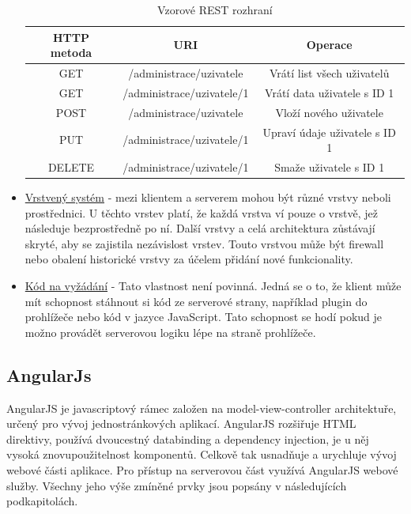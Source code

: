 \documentclass[czech,master,public,dept460,male,cpdeclaration,twoside]{diploma}
\begin{document}
\begin{itemize}
\begin{table}[H]
	\centering
	\caption{Vzorové REST rozhraní}
	\label{tab:REST}
	\begin{tabular}{|c|c|c|}
		\hline
		{\bf HTTP metoda} & {\bf URI} & {\bf Operace} \\
		\hline
		GET & /administrace/uzivatele & Vrátí list všech uživatelů \\
		\hline
		GET & /administrace/uzivatele/1 & Vrátí data uživatele s ID 1 \\
		\hline
		POST & /administrace/uzivatele & Vloží nového uživatele \\
		\hline
		PUT & /administrace/uzivatele/1 & Upraví údaje uživatele s ID 1 \\
		\hline
		DELETE & /administrace/uzivatele/1 & Smaže uživatele s ID 1 \\
		\hline
	\end{tabular}
\end{table}
	\item \underline{Vrstvený systém} - mezi klientem a serverem mohou být různé vrstvy neboli prostřednici. U těchto vrstev platí, že každá vrstva ví pouze o vrstvě, jež následuje bezprostředně po ní. Další vrstvy a celá architektura zůstávají skryté, aby se zajistila nezávislost vrstev. Touto vrstvou může být firewall nebo obalení historické vrstvy za účelem přidání nové funkcionality. 
	\item \underline{Kód na vyžádání} - Tato vlastnost není povinná. Jedná se o to, že klient může mít schopnost stáhnout si kód ze serverové strany, například plugin do prohlížeče nebo kód v jazyce JavaScript. Tato schopnost se hodí pokud je možno provádět serverovou logiku lépe na straně prohlížeče.
\end{itemize} \cite{RESTWebServicesOracle} \cite{RESTWebServicesOracle2}
	
\subsection{AngularJs}
AngularJS je javascriptový rámec založen na model-view-controller architektuře, určený pro vývoj jednostránkových aplikací. AngularJS rozšiřuje HTML direktivy, používá dvoucestný databinding a dependency injection, je u něj vysoká znovupoužitelnost komponentů. Celkově tak usnadňuje a urychluje vývoj webové části aplikace. Pro přístup na serverovou část využívá AngularJS webové služby. Všechny jeho výše zmíněné prvky jsou popsány v následujících podkapitolách. \cite{coJeAngular}
\end{document}
